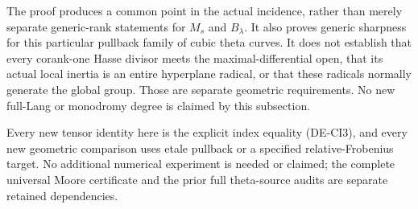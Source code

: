 \begin{remark}
\label{rem:DE-common-Cartier-incidence-scope}
The proof produces a common point in the actual incidence, rather
than merely separate generic-rank statements for \(M_s\) and
\(B_\lambda\).  It also proves generic sharpness for this particular
pullback family of cubic theta curves.  It does not establish that
every corank-one Hasse divisor meets the maximal-differential open,
that its actual local inertia is an entire hyperplane radical,
or that these radicals normally generate the global group.
Those are separate geometric requirements.  No new full-Lang or
monodromy degree is claimed by this subsection.

Every new tensor identity here is the explicit index equality
(DE-CI3), and every new geometric comparison uses etale pullback
or a specified relative-Frobenius target.  No additional numerical
experiment is needed or claimed; the complete universal Moore
certificate and the prior full theta-source audits are separate
retained dependencies.
\end{remark}
